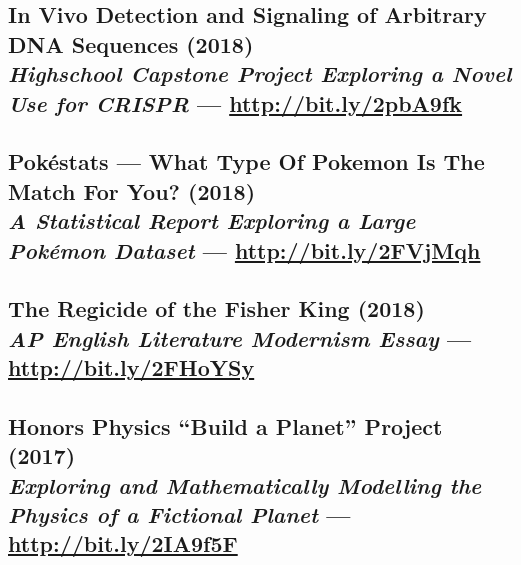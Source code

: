 \documentclass[twocolumn, a4paper, fontsize=9pt, headsepline, footsepline]{scrartcl}
\begin{document}
\subsection*{In Vivo Detection and Signaling of Arbitrary DNA Sequences
  (2018)\\\hspace{14.22636pt}\textmd{\emph{Highschool Capstone Project Exploring
    a Novel Use for CRISPR} — \url{http://bit.ly/2pbA9fk}}}

\subsection*{Pokéstats — What Type Of Pokemon Is The Match For You?
  (2018)\\\hspace{14.22636pt}\textmd{\emph{A Statistical Report Exploring a
    Large Pokémon Dataset} — \url{http://bit.ly/2FVjMqh}}}

\subsection*{The Regicide of the Fisher King (2018)\\\hspace{14.22636pt}\textmd{\emph{AP English
    Literature Modernism Essay} — \url{http://bit.ly/2FHoYSy}}}

\subsection*{Honors Physics “Build a Planet” Project (2017)\\\hspace{14.22636pt}\textmd{\emph{Exploring and
    Mathematically Modelling the Physics of a Fictional Planet} —
    \url{http://bit.ly/2IA9f5F}}}


\end{document}
